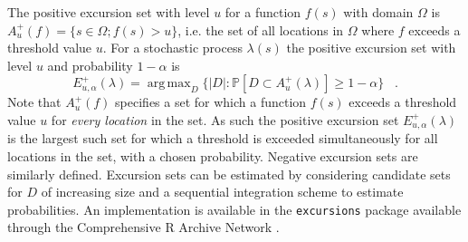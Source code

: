 \documentclass{stylefile16/statsoc}
\DeclareMathOperator*{\argmax}{arg\,max}  %
\begin{document}
The positive excursion set with level $u$ for a function $f(s)$ with domain $\Omega$ is $A_u^{+}(f) = \{ s \in \Omega ; f(s) > u \}$, i.e. the set of all locations in $\Omega$ where $f$ exceeds a threshold value $u$. For a stochastic process $\lambda(s)$ the positive excursion set with level $u$ and probability $1 - \alpha$ is
\begin{equation*}
E_{u,\alpha}^{+}(\lambda) = \argmax_{D}\{\lvert D \rvert : \mathbb{P}\left[D \subset A_u^{+}(\lambda)\right] \geq 1 - \alpha \} \;\;\; .
\end{equation*}
Note that $A_u^{+}(f)$ specifies a set for which a function $f(s)$ exceeds a threshold value $u$ for \textit{every location} in the set. As such the positive excursion set $E_{u,\alpha}^{+}(\lambda)$ is the largest such set for which a threshold is exceeded simultaneously for all locations in the set, with a chosen probability.  Negative excursion sets are similarly defined.  Excursion sets can be estimated by considering candidate sets for $D$ of increasing size and a sequential integration scheme to estimate probabilities.  An implementation is available in the \texttt{excursions} package \citep{bolin_calculating_2018} available through the Comprehensive R Archive Network \citep{r_2017}.
\end{document}
